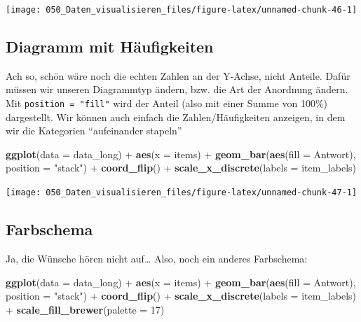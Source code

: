 \documentclass[12pt,]{book}
\makeatletter
\newenvironment{Shaded}{\begin{snugshade}}{\end{snugshade}}
\newcommand{\KeywordTok}[1]{\textcolor[rgb]{0.13,0.29,0.53}{\textbf{{#1}}}}
\newcommand{\DataTypeTok}[1]{\textcolor[rgb]{0.13,0.29,0.53}{{#1}}}
\newcommand{\DecValTok}[1]{\textcolor[rgb]{0.00,0.00,0.81}{{#1}}}
\newcommand{\StringTok}[1]{\textcolor[rgb]{0.31,0.60,0.02}{{#1}}}
\newcommand{\NormalTok}[1]{{#1}}
\newenvironment{kframe}{%
\medskip{}
\setlength{\fboxsep}{.8em}
 \def\at@end@of@kframe{}%
 \ifinner\ifhmode%
  \def\at@end@of@kframe{\end{minipage}}%
  \begin{minipage}{\columnwidth}%
 \fi\fi%
 \def\FrameCommand##1{\hskip\@totalleftmargin \hskip-\fboxsep
 \colorbox{shadecolor}{##1}\hskip-\fboxsep
     \hskip-\linewidth \hskip-\@totalleftmargin \hskip\columnwidth}%
 \MakeFramed {\advance\hsize-\width
   \@totalleftmargin\z@ \linewidth\hsize
   \@setminipage}}%
 {\par\unskip\endMakeFramed%
 \at@end@of@kframe}
\renewenvironment{Shaded}{\begin{kframe}}{\end{kframe}}
\makeatother
\begin{document}
\begin{center}\texttt{[image: 050\_Daten\_visualisieren\_files/figure-latex/unnamed-chunk-46-1]} \end{center}

\subsection{Diagramm mit Häufigkeiten}\label{diagramm-mit-haufigkeiten}

Ach so, schön wäre noch die echten Zahlen an der Y-Achse, nicht Anteile.
Dafür müssen wir unseren Diagrammtyp ändern, bzw. die Art der Anordnung
ändern. Mit \texttt{position\ =\ "fill"} wird der Anteil (also mit einer
Summe von 100\%) dargestellt. Wir können auch einfach die
Zahlen/Häufigkeiten anzeigen, in dem wir die Kategorien ``aufeinander
stapeln''

\begin{Shaded}
\begin{Highlighting}[]
\KeywordTok{ggplot}\NormalTok{(}\DataTypeTok{data =} \NormalTok{data_long) +}
\StringTok{  }\KeywordTok{aes}\NormalTok{(}\DataTypeTok{x =} \NormalTok{items)  +}
\StringTok{  }\KeywordTok{geom_bar}\NormalTok{(}\KeywordTok{aes}\NormalTok{(}\DataTypeTok{fill =} \NormalTok{Antwort), }\DataTypeTok{position =} \StringTok{"stack"}\NormalTok{) +}
\StringTok{  }\KeywordTok{coord_flip}\NormalTok{() +}
\StringTok{  }\KeywordTok{scale_x_discrete}\NormalTok{(}\DataTypeTok{labels =} \NormalTok{item_labels) }
\end{Highlighting}
\end{Shaded}

\begin{center}\texttt{[image: 050\_Daten\_visualisieren\_files/figure-latex/unnamed-chunk-47-1]} \end{center}

\subsection{Farbschema}\label{farbschema}

Ja, die Wünsche hören nicht auf\ldots{} Also, noch ein anderes
Farbschema:

\begin{Shaded}
\begin{Highlighting}[]
\KeywordTok{ggplot}\NormalTok{(}\DataTypeTok{data =} \NormalTok{data_long) +}
\StringTok{  }\KeywordTok{aes}\NormalTok{(}\DataTypeTok{x =} \NormalTok{items)  +}
\StringTok{  }\KeywordTok{geom_bar}\NormalTok{(}\KeywordTok{aes}\NormalTok{(}\DataTypeTok{fill =} \NormalTok{Antwort), }\DataTypeTok{position =} \StringTok{"stack"}\NormalTok{) +}
\StringTok{  }\KeywordTok{coord_flip}\NormalTok{() +}
\StringTok{  }\KeywordTok{scale_x_discrete}\NormalTok{(}\DataTypeTok{labels =} \NormalTok{item_labels) +}
\StringTok{  }\KeywordTok{scale_fill_brewer}\NormalTok{(}\DataTypeTok{palette =} \DecValTok{17}\NormalTok{)}
\end{Highlighting}
\end{Shaded}
\end{document}
